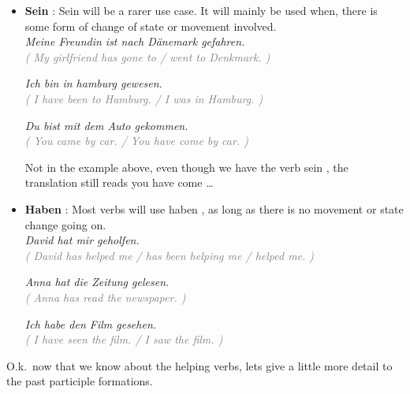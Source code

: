 \documentclass[a4paper,twocolumn,10pt]{article}
\newcommand{\newpar}
{\par \vspace{0.3cm}}
\begin{document}
\begin{itemize}[noitemsep]

	\item \textbf{Sein} :  Sein will be a rarer use case. It will mainly be used
		when, there is some form of change of state or movement involved.\\

		\textit{Meine Freundin ist nach Dänemark gefahren.}\\
		\textcolor{gray} { \textit{( My girlfriend has gone to / went to
				Denkmark. )} } \newpar
		
		\textit{Ich bin in hamburg gewesen.}\\
		\textcolor{gray} { \textit{( I have been to Hamburg. / I was in Hamburg. )} } \newpar
		
		\textit{Du bist mit dem Auto gekommen.}\\
		\textcolor{gray} { \textit{( You came by car. / You have come by car. )} } \newpar
	
	Not in the example above, even though we have the verb sein , the
	translation still reads you have come \ldots

	\item \textbf{Haben} : Most verbs will use haben , as long as there is no
		movement or state change going on.\\

		\textit{David hat mir geholfen.}\\
		\textcolor{gray} { \textit{( David has helped me / has been helping me /
				helped me. )} } \newpar
		
		\textit{Anna hat die Zeitung gelesen.}\\
		\textcolor{gray} { \textit{( Anna has read the newspaper. )} } \newpar
		
		\textit{Ich habe den Film gesehen.}\\
		\textcolor{gray} { \textit{( I have seen the film. / I saw the film. )} } \newpar

\end{itemize}


O.k.\ now that we know about the helping verbs, lets give a little more detail
to the past participle formations.


\end{document}
